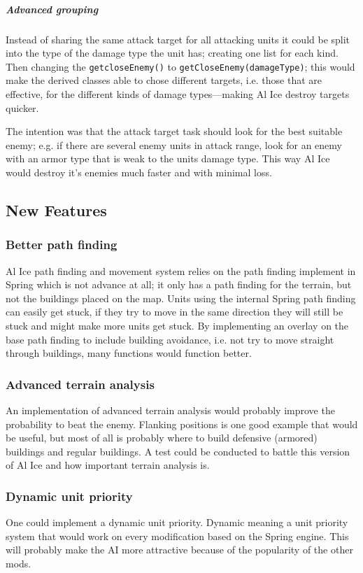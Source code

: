 \subparagraph{Advanced grouping}
Instead of sharing the same attack target for all attacking units it could be split into the type of
the damage type the unit has; creating one list for each kind. Then changing the
\texttt{getcloseEnemy()} to \texttt{getCloseEnemy(damageType)}; this would make the derived classes
able to chose different targets, i.e. those that are effective, for the different kinds of damage
types---making Al Ice destroy targets quicker.

The intention was that the attack target task should look for the best
suitable enemy; e.g. if there are several enemy units in attack range, look for an enemy with an armor type that is weak to the
units damage type. This way Al Ice would destroy it's enemies much faster and
with minimal loss.
 
\subsection{New Features}
\subsubsection{Better path finding} Al Ice path finding and movement system relies on the path finding
implement in Spring which is not advance at all; it only has a path finding for the terrain, but
not the buildings placed on the map. Units using the internal Spring path finding can easily get
stuck, if they try to move in the same direction they will still be stuck and might make more units
get stuck. By implementing an overlay on the base path finding to include building avoidance, i.e.
not try to move straight through buildings, many functions would function better.

\subsubsection{Advanced terrain analysis}
An implementation of advanced terrain analysis would probably improve the probability to beat the
enemy. Flanking positions is one good example that would be useful, but most of all is probably
where to build defensive (armored) buildings and regular buildings. A test could be conducted to
battle this version of Al Ice and how important terrain analysis is.

\subsubsection{Dynamic unit priority}
One could implement a dynamic unit priority. 
Dynamic meaning a unit priority system that would work on every modification
based on the Spring engine. This will probably make the AI more attractive because of the popularity
of the other mods.

